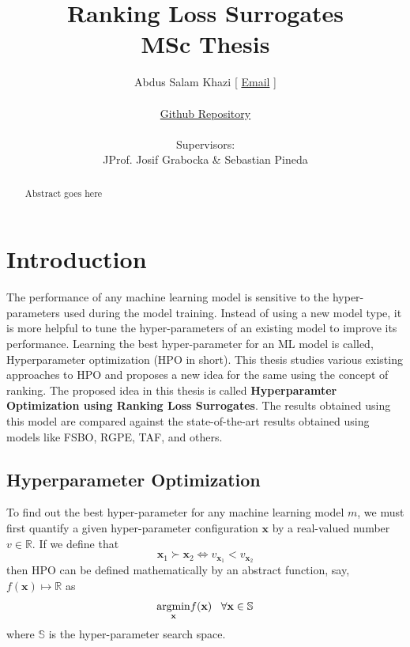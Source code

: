 \documentclass[11pt]{report}
\title {Ranking Loss Surrogates \\[1ex] \large MSc Thesis}
\author{
        Abdus Salam Khazi [
        \href{mailto:abdus.khazi@students.uni-freiburg.de}
                {Email} ]\\ \\
        \href{https://github.com/abduskhazi/ranking-loss-surrogates.git}
                {Github Repository} \cite{github_repository} \\ \\
        Supervisors:
        \begin{tabular}{ll}
             JProf. Josif Grabocka \&
			Sebastian Pineda
		\end{tabular}
       }
\begin{document}


\maketitle
\date{}

\newpage
{}
\begin{abstract}

Abstract goes here

\end{abstract}

\newpage

\tableofcontents
\newpage
\newpage


\chapter{Introduction}

The performance of any machine learning model is sensitive to the hyper-parameters used during the model training. 
Instead of using a new model type, it is more helpful to tune the hyper-parameters of an existing model to improve its performance.
Learning the best hyper-parameter for an ML model is called, Hyperparameter optimization (HPO in short).
This thesis studies various existing approaches to HPO and proposes a new idea for the same using the concept of ranking.
The proposed idea in this thesis is called \textbf{Hyperparamter Optimization using Ranking Loss Surrogates}. 
The results obtained using this model are compared against the state-of-the-art results obtained using models like FSBO,  RGPE,  TAF, and others. 

\section{Hyperparameter Optimization}
To find out the best hyper-parameter for any machine learning model $m$, we must first quantify a given hyper-parameter configuration $\textbf{x}$ by a real-valued number $v \in \mathbb{R}$.
If we define that
$$
\textbf{x}_1 \succ  \textbf{x}_2 \iff v_{\textbf{x}_1} < v_{\textbf{x}_2}
$$
then HPO can be defined mathematically by an abstract function, say,  $f(\textbf{x}) \mapsto \mathbb{R}$ as
$$
     \underset{\rm \textbf{x}}{\rm argmin}  f(\textbf{x}) \;\;\;  \forall \textbf{x} \in \mathbb{S}
$$
where $\mathbb{S}$ is the hyper-parameter search space.
\end{document}
